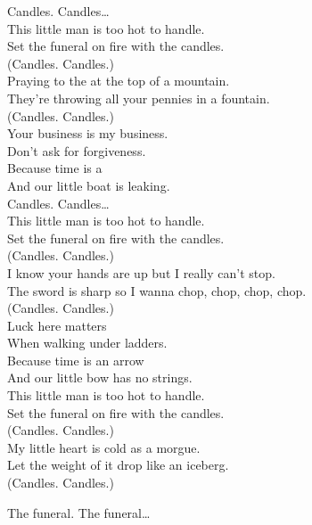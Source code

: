 


Candles. Candles… \\

This little man is too hot to handle. \\
Set the funeral on fire with the candles. \\
(Candles. Candles.) \\

Praying to the  at the top of a mountain. \\
They're throwing all your pennies in a fountain. \\
(Candles. Candles.) \\

Your business is my business. \\
Don't ask for forgiveness. \\
Because time is a  \\
And our little boat is leaking. \\

Candles. Candles… \\

This little man is too hot to handle. \\
Set the funeral on fire with the candles. \\
(Candles. Candles.) \\

I know your hands are up but I really can't stop. \\
The sword is sharp so I wanna chop, chop, chop, chop. \\
(Candles. Candles.) \\

Luck here matters \\
When walking under ladders. \\
Because time is an arrow \\
And our little bow has no strings. \\

This little man is too hot to handle. \\
Set the funeral on fire with the candles. \\
(Candles. Candles.) \\

My little heart is cold as a morgue. \\
Let the weight of it drop like an iceberg. \\
(Candles. Candles.) \\




The funeral. The funeral… \\
